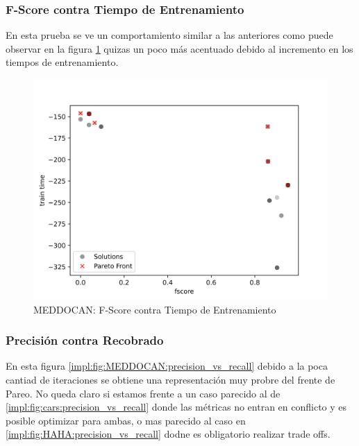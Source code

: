 \subsubsection{F-Score contra Tiempo de Entrenamiento}

En esta prueba se ve un comportamiento similar a las anteriores como puede observar en la figura  \ref{impl:fig:MEDDOCAN:fscore_vs_train_time} quizas un poco m\'as acentuado debido al incremento en los tiempos de entrenamiento.

\begin{figure}[ht]
    \centering
    \includegraphics[scale=0.65]{Pictures/meddocan_fscore_vs_train.jpg}
    \caption{MEDDOCAN: F-Score contra Tiempo de Entrenamiento}
    \label{impl:fig:MEDDOCAN:fscore_vs_train_time}
\end{figure}


\subsubsection{Precisi\'on contra Recobrado}

En esta figura \ref{impl:fig:MEDDOCAN:precision_vs_recall} debido a la poca cantiad de iteraciones se obtiene una representaci\'on muy probre del frente de Pareo. No queda claro si estamos frente a un caso parecido al de \ref{impl:fig:cars:precision_vs_recall} donde las m\'etricas no entran en conflicto y es posible optimizar para ambas, o mas parecido al caso en \ref{impl:fig:HAHA:precision_vs_recall} dodne es obligatorio realizar trade offs.

